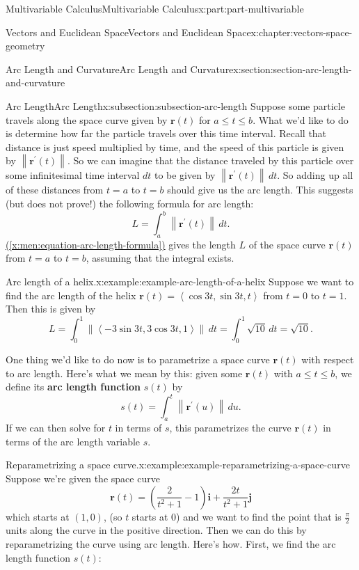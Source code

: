 \documentclass[twoside,10pt,]{book}
\newcommand{\xreffont}{\relax}
\newcommand{\terminology}[1]{\textbf{#1}}
\numberwithin{equation}{part}
\newcommand{\norm}[1]{\left\| #1 \right\|}
\newcommand{\dotprod}[1]{\left\langle #1 \right\rangle}
\begin{document}
\begin{partptx}{Multivariable Calculus}{}{Multivariable Calculus}{}{}{x:part:part-multivariable}
\begin{chapterptx}{Vectors and Euclidean Space}{}{Vectors and Euclidean Space}{}{}{x:chapter:vectors-space-geometry}
\begin{sectionptx}{Arc Length and Curvature}{}{Arc Length and Curvature}{}{}{x:section:section-arc-length-and-curvature}
\begin{subsectionptx}{Arc Length}{}{Arc Length}{}{}{x:subsection:subsection-arc-length}
Suppose some particle travels along the space curve given by \(\mathbf{r}(t)\) for \(a\leq t\leq b\). What we'd like to do is determine how far the particle travels over this time interval. Recall that distance is just speed multiplied by time, and the speed of this particle is given by \(\norm{\mathbf{r}^\prime(t)}\). So we can imagine that the distance traveled by this particle over some infinitesimal time interval \(dt\) to be given by \(\norm{\mathbf{r}^\prime(t)}\,dt\). So adding up all of these distances from \(t=a\) to \(t=b\) should give us the arc length. This suggests (but does not prove!) the following formula for arc length:%
%
\begin{equation}
L = \int_{a}^{b}\norm{\mathbf{r}^\prime(t)}\,dt.\label{x:men:equation-arc-length-formula}
\end{equation}
\hyperref[x:men:equation-arc-length-formula]{({\xreffont\ref{x:men:equation-arc-length-formula}})} gives the length \(L\) of the space curve \(\mathbf{r}(t)\) from \(t=a\) to \(t=b\), assuming that the integral exists.%
\begin{example}{Arc length of a helix.}{x:example:example-arc-length-of-a-helix}%
Suppose we want to find the arc length of the helix \(\mathbf{r}(t) = \dotprod{\cos 3t,\sin 3t, t}\) from \(t=0\) to \(t=1\). Then this is given by%
%
\begin{equation*}
L = \int_{0}^{1}\norm{\dotprod{-3\sin3t, 3\cos3t, 1}}\,dt = \int_{0}^{1}\sqrt{10}\,dt = \sqrt{10}.
\end{equation*}
\end{example}
One thing we'd like to do now is to parametrize a space curve \(\mathbf{r}(t)\) with respect to arc length. Here's what we mean by this: given some \(\mathbf{r}(t)\) with \(a\leq t\leq b\), we define its \terminology{arc length function} \(s(t)\) by%
%
\begin{equation*}
s(t) = \int_{a}^{t}\norm{\mathbf{r}^\prime(u)}\,du.
\end{equation*}
If we can then solve for \(t\) in terms of \(s\), this parametrizes the curve \(\mathbf{r}(t)\) in terms of the arc length variable \(s\).%
\begin{example}{Reparametrizing a space curve.}{x:example:example-reparametrizing-a-space-curve}%
Suppose we're given the space curve%
%
\begin{equation*}
\mathbf{r}(t) = \left(\frac{2}{t^{2}+1}-1\right)\mathbf{i}+\frac{2t}{t^{2}+1}\mathbf{j}
\end{equation*}
which starts at \((1,0)\), (so \(t\) starts at \(0\)) and we want to find the point that is \(\frac{\pi}{2}\) units along the curve in the positive direction. Then we can do this by reparametrizing the curve using arc length. Here's how. First, we find the arc length function \(s(t)\):%

\end{example}
\end{subsectionptx}
\end{sectionptx}
\end{chapterptx}
\end{partptx}
\end{document}
